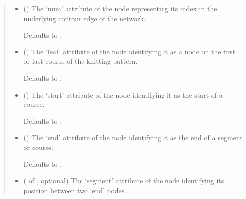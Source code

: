 \documentclass[letterpaper,10pt,english]{sphinxmanual}
\begin{document}
\begin{fulllineitems}
\begin{fulllineitems}
\begin{quote}
\begin{description}
\begin{itemize}
\item {} 
 (\sphinxstyleliteralemphasis{\sphinxupquote{, }}) \textendash{} 
The ‘num’ attribute of the node representing its index in the
underlying contour edge of the network.

Defaults to .


\item {} 
 (\sphinxstyleliteralemphasis{\sphinxupquote{, }}) \textendash{} 
The ‘leaf’ attribute of the node identifying it as a node on the
first or last course of the knitting pattern.

Defaults to .


\item {} 
 (\sphinxstyleliteralemphasis{\sphinxupquote{, }}) \textendash{} 
The ‘start’ attribute of the node identifying it as the start of
a course.

Defaults to .


\item {} 
 (\sphinxstyleliteralemphasis{\sphinxupquote{, }}) \textendash{} 
The ‘end’ attribute of the node identifying it as the end of a
segment or course.

Defaults to .


\item {} 
 ( of , optional) \textendash{} 
The ‘segment’ attribute of the node identifying its position
between two ‘end’ nodes.


\end{itemize}
\end{description}
\end{quote}
\end{fulllineitems}
\end{fulllineitems}
\end{document}
